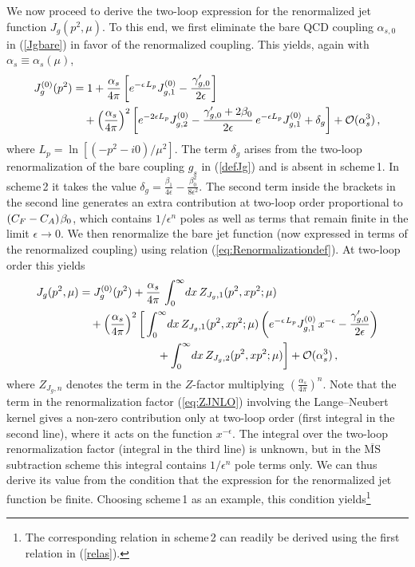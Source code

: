 \documentclass[12pt]{article}
\newcommand{\spac}{{\hspace{0.3mm}}}
\numberwithin{equation}{section}
\begin{document}
We now proceed to derive the two-loop expression for the renormalized jet function $J_g(p^2\!,\mu)$. To this end, we first eliminate the bare QCD coupling $\alpha_{s,0}$ in (\ref{Jgbare}) in favor of the renormalized coupling. This yields, again with $\alpha_s\equiv\alpha_s(\mu)$, 
\begin{equation}
\begin{aligned}
   J_g^{(0)}(p^2) 
   &= 1 + \frac{\alpha_s}{4\pi} 
    \left[ e^{-\epsilon\spac L_p} J_{g,1}^{(0)} - \frac{\spac\gamma_{g,0}'}{2\epsilon} \right] \\
   &\quad + \left( \frac{\alpha_s}{4\pi} \right)^2 \left[ e^{-2\epsilon L_p} J_{g,2}^{(0)}
    - \frac{\gamma_{g,0}'+2\beta_0}{2\epsilon}\,e^{-\epsilon L_p} J_{g,1}^{(0)} + \delta_g \right]
    + \mathcal{O}(\alpha_s^3) \,,
\end{aligned}
\end{equation}
where $L_p=\ln[(-p^2-i0)/\mu^2]$. The term $\delta_g$ arises from the two-loop renormalization of the bare coupling $g_s$ in (\ref{defJg}) and is absent in scheme\,1. In scheme\,2 it takes the value $\delta_g=\frac{\beta_1}{4\epsilon}-\frac{\beta_0^2}{8\epsilon^2}$. The second term inside the brackets in the second line generates an extra contribution at two-loop order proportional to $(C_F-C_A)\spac\beta_0$, which contains $1/\epsilon^n$ poles as well as terms that remain finite in the limit $\epsilon\to 0$. We then renormalize the bare jet function (now expressed in terms of the renormalized coupling) using relation (\ref{eq:Renormalizationdef}). At two-loop order this yields 
\begin{equation}
\begin{aligned}
   J_g(p^2,\mu) 
   &= J_g^{(0)}(p^2) + \frac{\alpha_s}{4\pi}\,\int_0^\infty\!dx\,Z_{J_g,1}(p^2,x p^2;\mu) \\
   &\quad + \left( \frac{\alpha_s}{4\pi} \right)^2 \bigg[
    \int_0^\infty\!dx\,Z_{J_g,1}(p^2,x p^2;\mu) \left( e^{-\epsilon\spac L_p} J_{g,1}^{(0)}\,x^{-\epsilon} 
    - \frac{\gamma_{g,0}'}{2\epsilon} \right) \\
   &\hspace{2.47cm} + \int_0^\infty\!dx\,Z_{J_g,2}(p^2,x p^2;\mu) \bigg] + \mathcal{O}(\alpha_s^3) \,,
\end{aligned}
\end{equation}
where $Z_{J_g,n}$ denotes the term in the $Z$-factor multiplying $\left(\frac{\alpha_s}{4\pi}\right)^n$. Note that the term in the renormalization factor (\ref{eq:ZJNLO}) involving the Lange--Neubert kernel gives a non-zero contribution only at two-loop order (first integral in the second line), where it acts on the function $x^{-\epsilon}$. The integral over the two-loop renormalization factor (integral in the third line) is unknown, but in the $\overline{\text{MS}}$ subtraction scheme this integral contains $1/\epsilon^n$ pole terms only. We can thus derive its value from the condition that the expression for the renormalized jet function be finite. Choosing scheme\,1 as an example, this condition yields\footnote{The corresponding relation in scheme\,2 can readily be derived using the first relation in (\ref{relas}).} 
\end{document}
